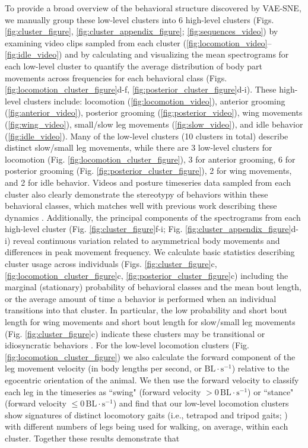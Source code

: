 \documentclass[11pt,a4paper,oneside]{book}
\begin{document}
\begin{doublespace}
To provide a broad overview of the behavioral structure discovered by VAE-SNE, we manually group these low-level clusters into 6 high-level clusters (Figs. \ref{fig:cluster_figure}, \ref{fig:cluster_appendix_figure}; \ref{fig:sequences_video}) by examining video clips sampled from each cluster (\ref{fig:locomotion_video}--\ref{fig:idle_video}) and by calculating and visualizing the mean spectrograms for each low-level cluster to quantify the average distribution of body part movements across frequencies for each behavioral class (Figs. \ref{fig:locomotion_cluster_figure}d-f, \ref{fig:posterior_cluster_figure}d-i). These high-level clusters include: locomotion (\ref{fig:locomotion_video}), anterior grooming (\ref{fig:anterior_video}), posterior grooming (\ref{fig:posterior_video}), wing movements (\ref{fig:wing_video}), small/slow leg movements (\ref{fig:slow_video}), and idle behavior (\ref{fig:idle_video}). Many of the low-level clusters (10 clusters in total) describe distinct slow/small leg movements, while there are 3 low-level clusters for locomotion (Fig. \ref{fig:locomotion_cluster_figure}), 3 for anterior grooming, 6 for posterior grooming (Fig. \ref{fig:posterior_cluster_figure}), 2 for wing movements, and 2 for idle behavior. Videos and posture timeseries data sampled from each cluster also clearly demonstrate the stereotypy of behaviors within these behavioral classes, which matches well with previous work describing these dynamics \citep{berman2014mapping, berman2016predictability, klibaite2017unsupervised, klibaite2019interacting, pereira2019fast}. Additionally, the principal components of the spectrograms from each high-level cluster (Fig. \ref{fig:cluster_figure}f-i; Fig. \ref{fig:cluster_appendix_figure}d-i) reveal continuous variation related to asymmetrical body movements and differences in peak movement frequency. We calculate basic statistics describing cluster usage across individuals (Figs. \ref{fig:cluster_figure}c, \ref{fig:locomotion_cluster_figure}c, \ref{fig:posterior_cluster_figure}c) including the marginal (stationary) probability of behavioral classes and the mean bout length, or the average amount of time a behavior is performed when an individual transitions into that cluster. In particular, the low probability and short bout length for wing movements and short bout length for slow/small leg movements (Fig. \ref{fig:cluster_figure}c) indicate these clusters may be transitional or idiosyncratic behaviors \citep{todd2017systematic}. For the low-level locomotion clusters (Fig. \ref{fig:locomotion_cluster_figure}) we also calculate the forward component of the leg movement velocity (in body lengths per second, or $\textrm{BL} \cdot \textrm{s}^{-1}$) relative to the egocentric orientation of the animal. We then use the forward velocity to classify each leg in the timeseries as ``swing" (forward velocity $> 0 \, \textrm{BL} \cdot \textrm{s}^{-1}$) or ``stance" (forward velocity $\leq 0 \, \textrm{BL} \cdot \textrm{s}^{-1}$) and find that our low-level locomotion clusters show signatures of distinct locomotory gaits (i.e., tetrapod and tripod gaits; \citealt{mendes2013quantification, pereira2019fast}) with different numbers of legs being used for walking, on average, within each cluster. Together these results demonstrate that 
\end{doublespace}
\end{document}
